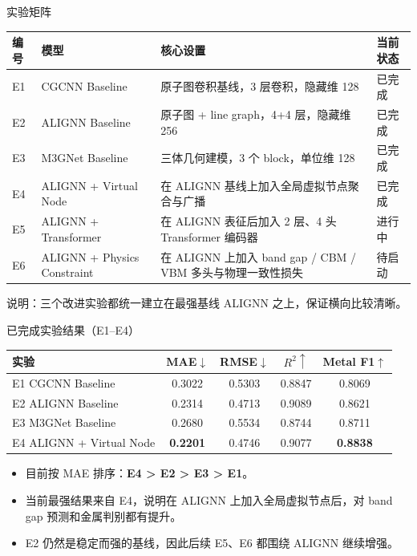 \documentclass{beamer}
\begin{document}
\begin{frame}{实验矩阵}
\scriptsize
\centering
\setlength{\tabcolsep}{3pt}
\begin{tabular}{p{0.8cm} p{2.6cm} p{4.5cm} p{1.4cm}}
\toprule
编号 & 模型 & 核心设置 & 当前状态 \\
\midrule
E1 & CGCNN Baseline & 原子图卷积基线，3 层卷积，隐藏维 128 & 已完成 \\
E2 & ALIGNN Baseline & 原子图 + line graph，4+4 层，隐藏维 256 & 已完成 \\
E3 & M3GNet Baseline & 三体几何建模，3 个 block，单位维 128 & 已完成 \\
E4 & ALIGNN + Virtual Node & 在 ALIGNN 基线上加入全局虚拟节点聚合与广播 & 已完成 \\
E5 & ALIGNN + Transformer & 在 ALIGNN 表征后加入 2 层、4 头 Transformer 编码器 & 进行中 \\
E6 & ALIGNN + Physics Constraint & 在 ALIGNN 上加入 band gap / CBM / VBM 多头与物理一致性损失 & 待启动 \\
\bottomrule
\end{tabular}

\vspace{2mm}
\footnotesize
说明：三个改进实验都统一建立在最强基线 ALIGNN 之上，保证横向比较清晰。
\end{frame}

\begin{frame}{已完成实验结果（E1--E4）}
\scriptsize
\centering
\begin{tabular}{p{3.1cm}cccc}
\toprule
实验 & MAE$\downarrow$ & RMSE$\downarrow$ & $R^2\uparrow$ & Metal F1$\uparrow$ \\
\midrule
E1 CGCNN Baseline & 0.3022 & 0.5303 & 0.8847 & 0.8069 \\
E2 ALIGNN Baseline & 0.2314 & 0.4713 & 0.9089 & 0.8621 \\
E3 M3GNet Baseline & 0.2680 & 0.5534 & 0.8744 & 0.8711 \\
E4 ALIGNN + Virtual Node & \textbf{0.2201} & 0.4746 & 0.9077 & \textbf{0.8838} \\
\bottomrule
\end{tabular}

\vspace{2mm}
\small
\begin{itemize}
  \item 目前按 MAE 排序：\textbf{E4 > E2 > E3 > E1}。
  \item 当前最强结果来自 E4，说明在 ALIGNN 上加入全局虚拟节点后，对 band gap 预测和金属判别都有提升。
  \item E2 仍然是稳定而强的基线，因此后续 E5、E6 都围绕 ALIGNN 继续增强。
\end{itemize}
\end{frame}
\end{document}
